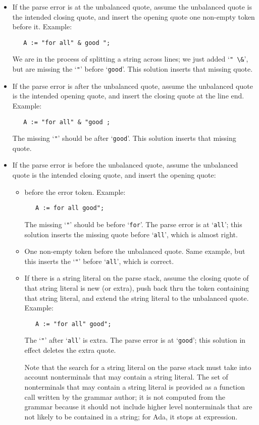 \documentclass{article}
\newcommand{\code}[1]{`\lstinline|#1|'}
\begin{document}
\begin{itemize}
\item If the parse error is at the unbalanced quote, assume the unbalanced
quote is the intended closing quote, and insert the opening quote one
non-empty token before it. Example:
\begin{lstlisting}
   A := "for all" & good ";
\end{lstlisting}
We are in the process of splitting a string across lines; we just
added \code{" \&}, but are missing the \code{"} before \code{good}.
This solution inserts that missing quote.

\item If the parse error is after the unbalanced quote, assume the unbalanced
quote is the intended opening quote, and insert the closing quote at
the line end. Example:
\begin{lstlisting}
   A := "for all" & "good ;
\end{lstlisting}
The missing \code{"} should be after \code{good}.
This solution inserts that missing quote.

\item If the parse error is before the unbalanced quote, assume the unbalanced
quote is the intended closing quote, and insert the opening quote:

\begin{itemize}
\item before the error token. Example:
\begin{lstlisting}
   A := for all good";
\end{lstlisting}
The missing \code{"} should be before \code{for}. The parse error is at \code{all};
this solution inserts the missing quote before \code{all}, which is
almost right.

\item One non-empty token before the unbalanced quote. Same example,
  but this inserts the \code{"} before \code{all}, which is correct.

\item If there is a string literal on the parse stack, assume the
  closing quote of that string literal is new (or extra), push back
  thru the token containing that string literal, and extend the string
  literal to the unbalanced quote.
  Example:
\begin{lstlisting}
   A := "for all" good";
\end{lstlisting}
The \code{"} after \code{all} is extra. The parse error is at \code{good};
this solution in effect deletes the extra quote.

Note that the search for a string literal on the parse stack must take
into account nonterminals that may contain a string literal. The set
of nonterminals that may contain a string literal is provided as a
function call written by the grammar author; it is not computed from
the grammar because it should not include higher level nonterminals
that are not likely to be contained in a string; for Ada, it stops at
expression.
\end{itemize}
\end{itemize}
\end{document}
